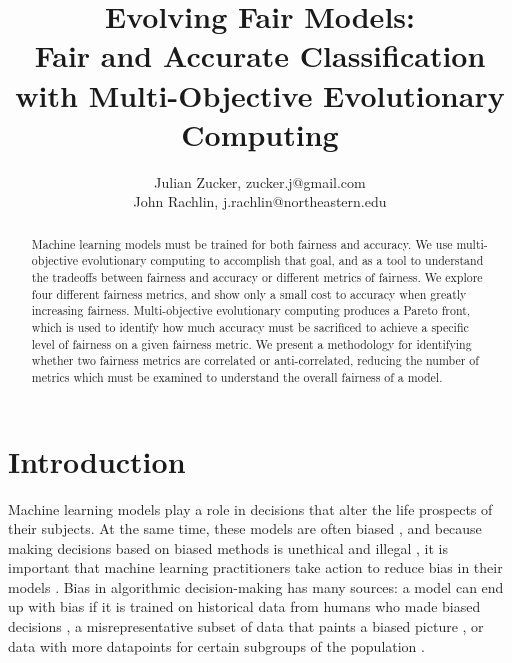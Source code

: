 \documentclass{elsarticle}
\begin{document}
\title{\bf Evolving Fair Models: \\
Fair and Accurate Classification with Multi-Objective Evolutionary Computing}  

\author{Julian Zucker, zucker.j@gmail.com \\
John Rachlin, j.rachlin@northeastern.edu
}

\begin{abstract}
Machine learning models must be trained for both fairness and accuracy. We use multi-objective evolutionary computing to accomplish that goal, and as a tool to understand the tradeoffs between fairness and accuracy or different metrics of fairness. We explore four different fairness metrics, and show only a small cost to accuracy when greatly increasing fairness. Multi-objective evolutionary computing produces a Pareto front, which is used to identify how much accuracy must be sacrificed to achieve a specific level of fairness on a given fairness metric. We present a methodology for identifying whether two fairness metrics are correlated or anti-correlated, reducing the number of metrics which must be examined to understand the overall fairness of a model. 
\end{abstract}

\maketitle

\section{Introduction}
Machine learning models play a role in decisions that alter the life prospects of their subjects. At the same time, these models are often biased \citep{Angwin:2016}, and because making decisions based on biased methods is unethical and illegal \citep{Barocas:2016}, it is important that machine learning practitioners take action to reduce bias in their models \citep{Binns:2017}. Bias in algorithmic decision-making has many sources: a model can end up with bias if it is trained on historical data from humans who made biased decisions \citep{Calders:2013}, a misrepresentative subset of data that paints a biased picture \citep{Suresh:2019}, or data with more datapoints for certain subgroups of the population \citep{Torralba:2011}. 
\end{document}
